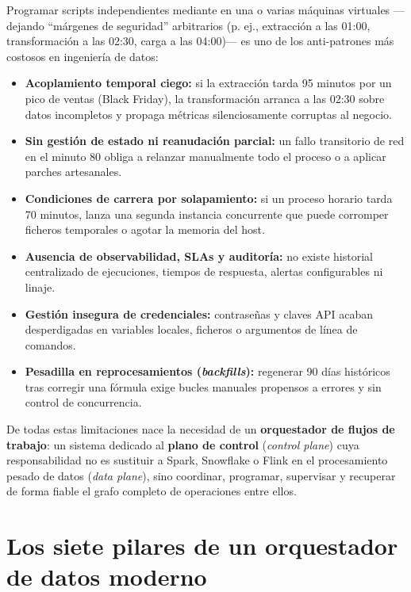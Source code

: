 \begin{warningbox}
Programar scripts independientes mediante  en una o varias máquinas virtuales ---dejando ``márgenes de seguridad'' arbitrarios (p. ej., extracción a las 01:00, transformación a las 02:30, carga a las 04:00)--- es uno de los anti-patrones más costosos en ingeniería de datos:
\begin{itemize}
  \item \textbf{Acoplamiento temporal ciego:} si la extracción tarda 95 minutos por un pico de ventas (Black Friday), la transformación arranca a las 02:30 sobre datos incompletos y propaga métricas silenciosamente corruptas al negocio.
  \item \textbf{Sin gestión de estado ni reanudación parcial:} un fallo transitorio de red en el minuto 80 obliga a relanzar manualmente todo el proceso o a aplicar parches artesanales.
  \item \textbf{Condiciones de carrera por solapamiento:} si un proceso horario tarda 70 minutos,  lanza una segunda instancia concurrente que puede corromper ficheros temporales o agotar la memoria del host.
  \item \textbf{Ausencia de observabilidad, SLAs y auditoría:} no existe historial centralizado de ejecuciones, tiempos de respuesta, alertas configurables ni linaje.
  \item \textbf{Gestión insegura de credenciales:} contraseñas y claves API acaban desperdigadas en variables locales, ficheros  o argumentos de línea de comandos.
  \item \textbf{Pesadilla en reprocesamientos (\textit{backfills}):} regenerar 90 días históricos tras corregir una fórmula exige bucles manuales propensos a errores y sin control de concurrencia.
\end{itemize}
\end{warningbox}

De todas estas limitaciones nace la necesidad de un \textbf{orquestador de flujos de trabajo}: un sistema dedicado al \textbf{plano de control} (\textit{control plane}) cuya responsabilidad no es sustituir a Spark, Snowflake o Flink en el procesamiento pesado de datos (\textit{data plane}), sino coordinar, programar, supervisar y recuperar de forma fiable el grafo completo de operaciones entre ellos.

\section{Los siete pilares de un orquestador de datos moderno}\label{sec:siete-pilares}

